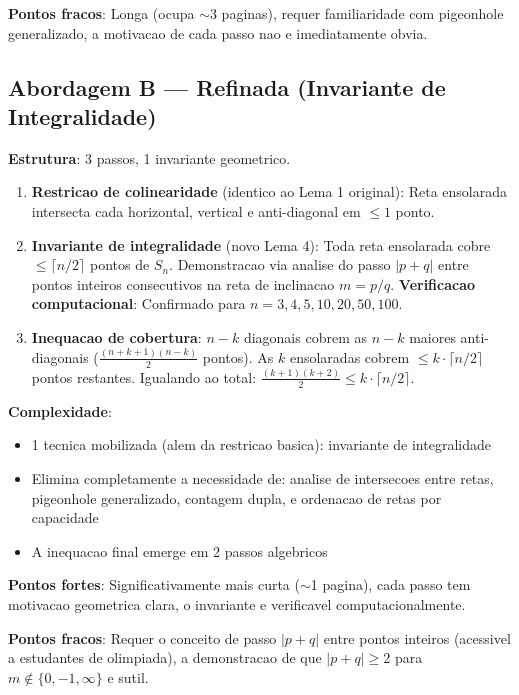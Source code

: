 \documentclass[5p]{elsarticle}
\theoremstyle{definition}
\begin{document}
\textbf{Pontos fracos}: Longa (ocupa $\sim$3 paginas), requer familiaridade com
pigeonhole generalizado, a motivacao de cada passo nao e imediatamente obvia.

\subsection{Abordagem B — Refinada (Invariante de Integralidade)}

\textbf{Estrutura}: 3 passos, 1 invariante geometrico.

\begin{enumerate}[label=\textbf{B\arabic*}.]
  \item \textbf{Restricao de colinearidade} (identico ao Lema 1 original): Reta
    ensolarada intersecta cada horizontal, vertical e anti-diagonal em $\leq 1$ ponto.
  \item \textbf{Invariante de integralidade} (novo Lema 4): Toda reta ensolarada
    cobre $\leq \lceil n/2 \rceil$ pontos de $S_n$. Demonstracao via analise do passo
    $|p+q|$ entre pontos inteiros consecutivos na reta de inclinacao $m = p/q$.
    \textbf{Verificacao computacional}: Confirmado para $n = 3, 4, 5, 10, 20, 50, 100$.
  \item \textbf{Inequacao de cobertura}: $n-k$ diagonais cobrem as $n-k$ maiores
    anti-diagonais ($\frac{(n+k+1)(n-k)}{2}$ pontos). As $k$ ensolaradas cobrem
    $\leq k \cdot \lceil n/2 \rceil$ pontos restantes. Igualando ao total:
    $\frac{(k+1)(k+2)}{2} \leq k \cdot \lceil n/2 \rceil$.
\end{enumerate}

\textbf{Complexidade}:
\begin{itemize}
  \item 1 tecnica mobilizada (alem da restricao basica): invariante de integralidade
  \item Elimina completamente a necessidade de: analise de intersecoes entre retas,
    pigeonhole generalizado, contagem dupla, e ordenacao de retas por capacidade
  \item A inequacao final emerge em 2 passos algebricos
\end{itemize}

\textbf{Pontos fortes}: Significativamente mais curta ($\sim$1 pagina), cada passo tem
motivacao geometrica clara, o invariante e verificavel computacionalmente.

\textbf{Pontos fracos}: Requer o conceito de passo $|p+q|$ entre pontos inteiros
(acessivel a estudantes de olimpiada), a demonstracao de que $|p+q| \geq 2$ para
$m \notin \{0,-1,\infty\}$ e sutil.
\end{document}
